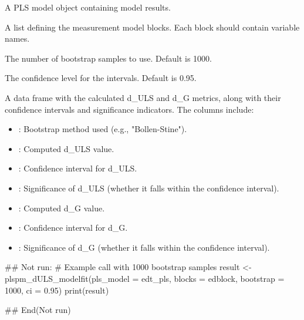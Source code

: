 \documentclass[a4paper]{book}
\begin{document}
%
\begin{Arguments}
\begin{ldescription}
\item[\code{pls\_model}] A PLS model object containing model results.

\item[\code{blocks}] A list defining the measurement model blocks. Each block should contain variable names.

\item[\code{bootstrap}] The number of bootstrap samples to use. Default is 1000.

\item[\code{ci}] The confidence level for the intervals. Default is 0.95.
\end{ldescription}
\end{Arguments}
%
\begin{Value}
A data frame with the calculated d\_ULS and d\_G metrics, along with their confidence intervals and significance indicators.
The columns include:
\begin{itemize}

\item{} : Bootstrap method used (e.g., "Bollen-Stine").
\item{} : Computed d\_ULS value.
\item{} : Confidence interval for d\_ULS.
\item{} : Significance of d\_ULS (whether it falls within the confidence interval).
\item{} : Computed d\_G value.
\item{} : Confidence interval for d\_G.
\item{} : Significance of d\_G (whether it falls within the confidence interval).

\end{itemize}

\end{Value}
%
\begin{Examples}
\begin{ExampleCode}
\#\# Not run: 
# Example call with 1000 bootstrap samples
result <- plspm_dULS_modelfit(pls_model = edt_pls, blocks = edblock, bootstrap = 1000, ci = 0.95)
print(result)

## End(Not run)

\end{ExampleCode}
\end{Examples}
\end{document}

